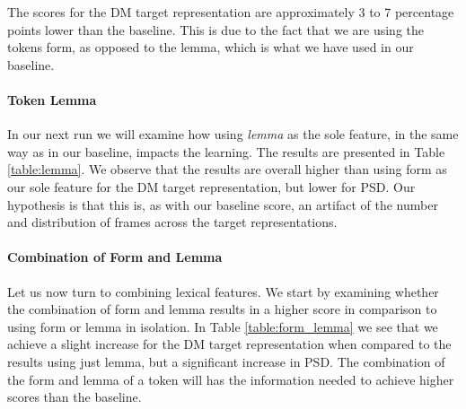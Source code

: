 The scores for the DM target representation are approximately 3 to 7 percentage points lower than the baseline. This is due to the fact that we are using the tokens form, as opposed to the lemma, which is what we have used in our baseline.

\paragraph{Token Lemma} In our next run we will examine how using \textit{lemma} as the sole feature, in the same way as in our baseline, impacts the learning. The results are presented in Table \ref{table:lemma}. We observe that the results are overall higher than using form as our sole feature for the DM target representation, but lower for PSD. Our hypothesis is that this is, as with our baseline score, an artifact of the number and distribution of frames across the target representations. 


\paragraph{Combination of Form and Lemma} Let us now turn to combining lexical features. We start by examining whether the combination of form and lemma results in a higher score in comparison to using form or lemma in isolation. In Table \ref{table:form_lemma} we see that we achieve a slight increase for the DM target representation when compared to the results using just lemma, but a significant increase in PSD. The combination of the form and lemma of a token will has the information needed to achieve higher scores than the baseline.

